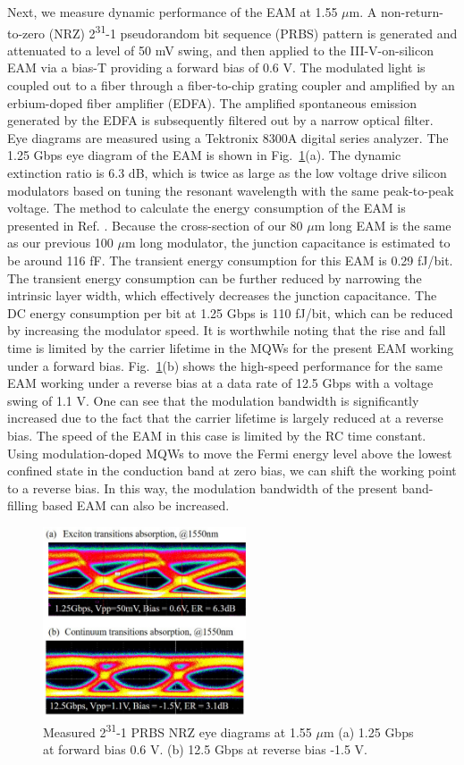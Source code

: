 \documentclass[aip,apl,reprint,a4paper]{revtex4-1}
\def\SP#1{\textsuperscript{#1}}
\begin{document}
Next, we measure dynamic performance of the EAM at 1.55 $\mu$m. A non-return-to-zero (NRZ)  2\SP{31}-1 pseudorandom bit sequence (PRBS) pattern is generated and  attenuated  to  a  level  of  50 mV  swing,  and then  applied  to  the III-V-on-silicon EAM via a bias-T providing a forward bias of 0.6 V. The modulated light is coupled out to a fiber through a fiber-to-chip grating coupler and amplified by an erbium-doped fiber amplifier (EDFA). The amplified spontaneous emission generated by the EDFA is subsequently filtered out by a narrow optical filter. Eye diagrams are measured using a Tektronix 8300A digital series analyzer. The 1.25 Gbps eye diagram of the EAM is shown in Fig.~\ref{fig:6}(a). The dynamic extinction ratio is 6.3 dB, which is twice as large as the low voltage drive silicon modulators based on tuning the resonant wavelength with the same peak-to-peak voltage.\cite{Shakoor:14} The method to calculate the energy consumption of the EAM is presented in Ref. . Because the cross-section of our 80 $\mu$m long EAM is the same as our previous 100 $\mu$m long modulator,\cite{fu52015} the junction capacitance is estimated to be around 116 fF. The transient energy consumption for this EAM is 0.29 fJ/bit. The transient energy consumption can be further reduced by narrowing the intrinsic layer width, which effectively decreases the junction capacitance. The DC energy consumption per bit at 1.25 Gbps is 110 fJ/bit, which can be reduced by increasing the modulator speed. It is worthwhile noting that the rise and fall time is limited by the carrier lifetime in the MQWs for the present EAM working under a forward bias. Fig.~\ref{fig:6}(b) shows the high-speed performance for the same EAM working under a reverse bias at a data rate of 12.5 Gbps with a voltage swing of 1.1 V. One can see that the modulation bandwidth is significantly increased due to the fact that the carrier lifetime is largely reduced at a reverse bias. The speed of the EAM in this case is limited by the RC time constant.\cite{Yong40,fu52015} Using modulation-doped MQWs to move the Fermi energy level above the lowest confined state in the conduction band at zero bias, we can shift the working point to a reverse bias.\cite{livescu1988free,kalinovsky1993free} In this way, the modulation bandwidth of the present band-filling based EAM can also be increased.

\begin{figure}
	\includegraphics[width=6cm]{figure/fig6.eps}%
	\caption{\label{fig:6} Measured 2\SP{31}-1 PRBS NRZ eye diagrams at 1.55 $\mu$m (a) 1.25 Gbps at forward bias 0.6 V.  (b) 12.5 Gbps at reverse bias -1.5 V.}
\end{figure}
\end{document}
